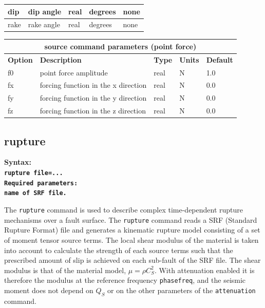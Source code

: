 \documentclass[11pt]{report}
\begin{document}
{\begin{center}
\begin{tabular}{|l|p{8cm}|l|l|l|}
		dip         & dip angle                           & real      & degrees    & none         \\ \hline
		rake        & rake angle                          & real      & degrees    & none         \\ \hline
	\end{tabular}
\end{center}
\begin{center}
	\begin{tabular}{|l|p{8cm}|l|l|l|} \hline
		\multicolumn{5}{|c|}{\bf source command parameters (point force)}                         \\ \hline
		\bf{Option} & \bf{Description}                    & \bf{Type} & \bf{Units} & \bf{Default} \\ \hline \hline
		f0          & point force amplitude               & real      & N          & 1.0          \\ \hline
		fx          & forcing function in the x direction & real      & N          & 0.0          \\ \hline
		fy          & forcing function in the y direction & real      & N          & 0.0          \\ \hline
		fz          & forcing function in the z direction & real      & N          & 0.0          \\ \hline
	\end{tabular}
\end{center}

\subsection{rupture}
\label{keyword:rupture}
\begin{flushleft}
	\bf
	Syntax:\\ \tt rupture file=...\\
	\bf
	Required parameters:\\ \rm name of SRF file.
\end{flushleft}
The \verb+rupture+ command is used to describe complex time-dependent rupture mechanisms over a
fault surface. The \verb+rupture+ command reads a SRF (Standard Rupture Format) file and generates a
kinematic rupture model consisting of a set of moment tensor source terms. The local shear modulus
of the material is taken into account to calculate the strength of each source terms such that the
prescribed amount of slip is achieved on each sub-fault of the SRF file. The shear modulus is that
of the material model, $\mu=\rho C_S^2$. With attenuation enabled it is therefore the modulus at
the reference frequency \verb+phasefreq+, and the seismic moment does not depend on $Q_S$ or on
the other parameters of the \verb+attenuation+ command.

}
\end{document}
